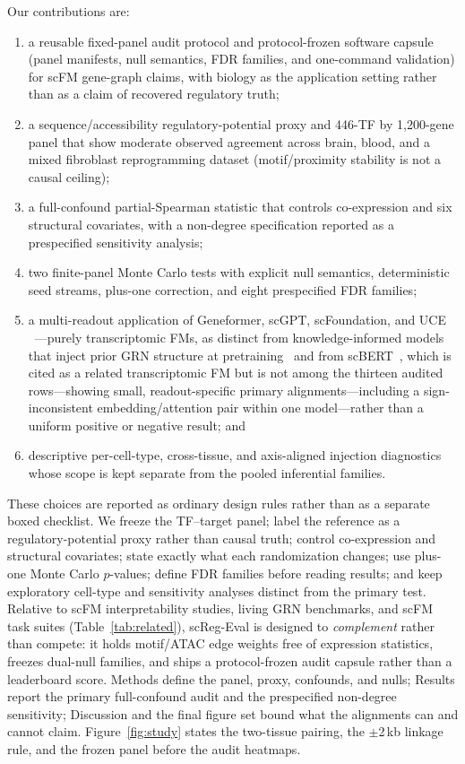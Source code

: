 \documentclass[fleqn,10pt,lineno]{wlpeerj}
\begin{document}
Our contributions are:
\begin{enumerate}
\item a reusable fixed-panel audit protocol and protocol-frozen software capsule (panel manifests,
null semantics, FDR families, and one-command validation) for scFM gene-graph claims, with
biology as the application setting rather than as a claim of recovered regulatory truth;
\item a sequence/accessibility regulatory-potential proxy and 446-TF by 1,200-gene panel that show
moderate observed agreement across brain, blood, and a mixed fibroblast reprogramming dataset
(motif/proximity stability is not a causal ceiling);
\item a full-confound partial-Spearman statistic that controls co-expression and six structural
covariates, with a non-degree specification reported as a prespecified sensitivity analysis;
\item two finite-panel Monte Carlo tests with explicit null semantics, deterministic seed streams,
plus-one correction, and eight prespecified FDR families;
\item a multi-readout application of Geneformer, scGPT, scFoundation, and UCE
~\citep{theodoris2023geneformer,cui2024scgpt,hao2024scfoundation,rosen2023uce}---purely
transcriptomic FMs, as distinct from knowledge-informed models that inject prior GRN structure at
pretraining~\citep{yang2024genecompass,hu2026regformer} and from scBERT~\citep{yang2022scbert},
which is cited as a related transcriptomic FM but is not among the thirteen audited rows---showing small,
readout-specific primary alignments---including a sign-inconsistent embedding/attention pair within
one model---rather than a uniform positive or negative result; and
\item descriptive per-cell-type, cross-tissue, and axis-aligned injection diagnostics whose scope is
kept separate from the pooled inferential families.
\end{enumerate}

These choices are reported as ordinary design rules rather than as a separate boxed checklist.
We freeze the TF--target panel; label the reference as a regulatory-potential proxy rather
than causal truth; control co-expression and structural covariates; state exactly what each
randomization changes; use plus-one Monte Carlo $p$-values; define FDR families before reading
results; and keep exploratory cell-type and sensitivity analyses distinct from the primary test.
Relative to scFM interpretability studies, living GRN benchmarks, and scFM task suites
(Table~\ref{tab:related}), scReg-Eval is designed to \emph{complement} rather than compete: it
holds motif/ATAC edge weights free of expression statistics, freezes dual-null families, and ships
a protocol-frozen audit capsule rather than a leaderboard score.
Methods define the panel, proxy, confounds, and nulls; Results report the primary full-confound
audit and the prespecified non-degree sensitivity; Discussion and the final figure set bound what the
alignments can and cannot claim. Figure~\ref{fig:study} states the two-tissue pairing, the
$\pm$2\,kb linkage rule, and the frozen panel before the audit heatmaps.
\end{document}
